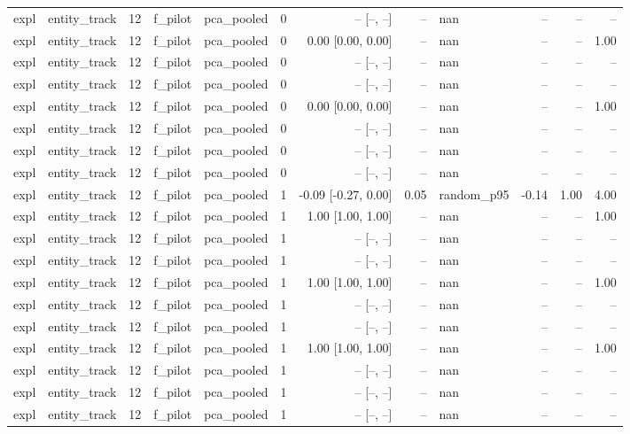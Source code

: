 \begin{tabular}{llrllrrrlrrr}
expl & entity\_track & 12 & f\_pilot & pca\_pooled & 0 & -- [--, --] & -- & nan & -- & -- & -- \\
expl & entity\_track & 12 & f\_pilot & pca\_pooled & 0 & 0.00 [0.00, 0.00] & -- & nan & -- & -- & 1.00 \\
expl & entity\_track & 12 & f\_pilot & pca\_pooled & 0 & -- [--, --] & -- & nan & -- & -- & -- \\
expl & entity\_track & 12 & f\_pilot & pca\_pooled & 0 & -- [--, --] & -- & nan & -- & -- & -- \\
expl & entity\_track & 12 & f\_pilot & pca\_pooled & 0 & 0.00 [0.00, 0.00] & -- & nan & -- & -- & 1.00 \\
expl & entity\_track & 12 & f\_pilot & pca\_pooled & 0 & -- [--, --] & -- & nan & -- & -- & -- \\
expl & entity\_track & 12 & f\_pilot & pca\_pooled & 0 & -- [--, --] & -- & nan & -- & -- & -- \\
expl & entity\_track & 12 & f\_pilot & pca\_pooled & 0 & -- [--, --] & -- & nan & -- & -- & -- \\
expl & entity\_track & 12 & f\_pilot & pca\_pooled & 1 & -0.09 [-0.27, 0.00] & 0.05 & random\_p95 & -0.14 & 1.00 & 4.00 \\
expl & entity\_track & 12 & f\_pilot & pca\_pooled & 1 & 1.00 [1.00, 1.00] & -- & nan & -- & -- & 1.00 \\
expl & entity\_track & 12 & f\_pilot & pca\_pooled & 1 & -- [--, --] & -- & nan & -- & -- & -- \\
expl & entity\_track & 12 & f\_pilot & pca\_pooled & 1 & -- [--, --] & -- & nan & -- & -- & -- \\
expl & entity\_track & 12 & f\_pilot & pca\_pooled & 1 & 1.00 [1.00, 1.00] & -- & nan & -- & -- & 1.00 \\
expl & entity\_track & 12 & f\_pilot & pca\_pooled & 1 & -- [--, --] & -- & nan & -- & -- & -- \\
expl & entity\_track & 12 & f\_pilot & pca\_pooled & 1 & -- [--, --] & -- & nan & -- & -- & -- \\
expl & entity\_track & 12 & f\_pilot & pca\_pooled & 1 & 1.00 [1.00, 1.00] & -- & nan & -- & -- & 1.00 \\
expl & entity\_track & 12 & f\_pilot & pca\_pooled & 1 & -- [--, --] & -- & nan & -- & -- & -- \\
expl & entity\_track & 12 & f\_pilot & pca\_pooled & 1 & -- [--, --] & -- & nan & -- & -- & -- \\
expl & entity\_track & 12 & f\_pilot & pca\_pooled & 1 & -- [--, --] & -- & nan & -- & -- & -- \\

\end{tabular}
